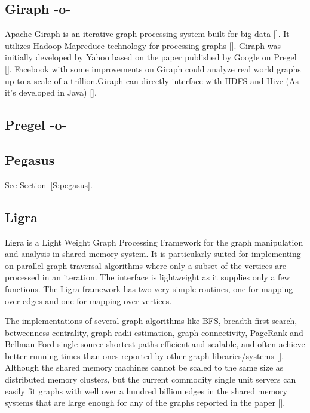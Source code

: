 \subsection{Giraph -o-}

Apache Giraph is an iterative graph processing system built for big
data [\cite{www-giraph-apache}]. It utilizes Hadoop Mapreduce technology
for processing graphs [\cite{www-apache-giraph-wiki}].  Giraph was
initially developed by Yahoo based on the paper published by Google on
Pregel [\cite{www-apache-giraph-pcworld}].  Facebook with some
improvements on Giraph could analyze real world graphs up to a scale
of a trillion.Giraph can directly interface with HDFS and Hive (As
it's developed in Java) [\cite{www-apache-giraph-fb}].


   
\subsection{Pregel -o-}



\subsection{Pegasus}

See Section~\ref{S:pegasus}.

\subsection{Ligra}

Ligra is a Light Weight Graph Processing Framework for the graph
manipulation and analysis in shared memory system. It is particularly
suited for implementing on parallel graph traversal algorithms where
only a subset of the vertices are processed in an iteration. The
interface is lightweight as it supplies only a few functions. The
Ligra framework has two very simple routines, one for mapping over
edges and one for mapping over vertices.

The implementations of several graph algorithms like BFS,
breadth-first search, betweenness centrality, graph radii estimation,
graph-connectivity, PageRank and Bellman-Ford single-source shortest
paths efficient and scalable, and often achieve better running times
than ones reported by other graph libraries/systems
[\cite{ligra-paper-2013}].  Although the shared memory machines cannot
be scaled to the same size as distributed memory clusters, but the
current commodity single unit servers can easily fit graphs with well
over a hundred billion edges in the shared memory systems that are
large enough for any of the graphs reported in the paper
[\cite{ligra-paper-2}].

